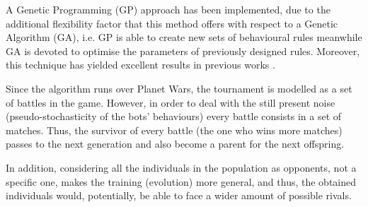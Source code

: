 \documentclass[conference]{IEEEtran}
\begin{document}
A Genetic Programming (GP) \cite{GP_Koza92} approach has been implemented, due to the additional flexibility factor that this method offers with respect to a Genetic Algorithm (GA), i.e. GP is able to create new sets of behavioural rules meanwhile GA is devoted to optimise the parameters of previously designed rules. Moreover, this technique has yielded excellent results in previous works \cite{GarciaGP14,EsparciaGP2013}.


Since the algorithm runs over Planet Wars, the tournament is modelled as a set of battles in the game. However, in order to deal with the still present noise (pseudo-stochasticity of the bots' behaviours) every battle consists in a set of matches.
Thus, the survivor of every battle (the one who wins more matches)
passes to the next generation and also become a parent for the next
offspring.


In addition,  considering all the individuals in the population as opponents, not a specific one, makes the training (evolution) more
general, and thus, the obtained individuals would, potentially, be able to face a wider amount of possible rivals.




\end{document}
